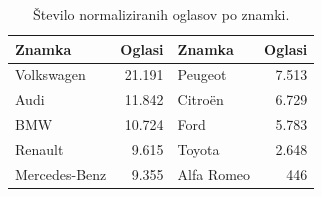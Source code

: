 \begin{table}[H]
  \centering
  \caption{Število normaliziranih oglasov po znamki.}
  \label{tab:podatki-znamke}
  \begin{tabular}{lr lr}
    \toprule
    \textbf{Znamka} & \textbf{Oglasi} & \textbf{Znamka} & \textbf{Oglasi} \\
    \midrule
    Volkswagen    & 21.191 & Peugeot     & 7.513 \\
    Audi          & 11.842 & Citroën     & 6.729 \\
    BMW           & 10.724 & Ford        & 5.783 \\
    Renault       & 9.615  & Toyota      & 2.648 \\
    Mercedes-Benz & 9.355  & Alfa Romeo  & 446 \\
    \bottomrule
  \end{tabular}
\end{table}

